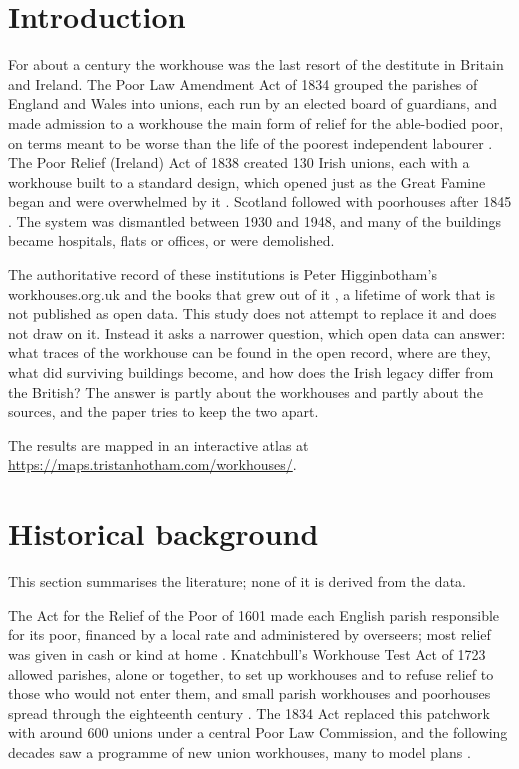 \documentclass[11pt,a4paper]{article}
\begin{document}
\section{Introduction}
For about a century the workhouse was the last resort of the destitute in Britain and Ireland. The Poor Law Amendment Act of 1834 grouped the parishes of England and Wales into unions, each run by an elected board of guardians, and made admission to a workhouse the main form of relief for the able-bodied poor, on terms meant to be worse than the life of the poorest independent labourer \citep{crowther,morrison}. The Poor Relief (Ireland) Act of 1838 created 130 Irish unions, each with a workhouse built to a standard design, which opened just as the Great Famine began and were overwhelmed by it \citep{oconnor,kinealy}. Scotland followed with poorhouses after 1845 \citep{higginbotham}. The system was dismantled between 1930 and 1948, and many of the buildings became hospitals, flats or offices, or were demolished.

The authoritative record of these institutions is Peter Higginbotham's workhouses.org.uk and the books that grew out of it \citep{higginbotham}, a lifetime of work that is not published as open data. This study does not attempt to replace it and does not draw on it. Instead it asks a narrower question, which open data can answer: what traces of the workhouse can be found in the open record, where are they, what did surviving buildings become, and how does the Irish legacy differ from the British? The answer is partly about the workhouses and partly about the sources, and the paper tries to keep the two apart.

The results are mapped in an interactive atlas at \url{https://maps.tristanhotham.com/workhouses/}.

\section{Historical background}
This section summarises the literature; none of it is derived from the data.

The Act for the Relief of the Poor of 1601 made each English parish responsible for its poor, financed by a local rate and administered by overseers; most relief was given in cash or kind at home \citep{slack}. Knatchbull's Workhouse Test Act of 1723 allowed parishes, alone or together, to set up workhouses and to refuse relief to those who would not enter them, and small parish workhouses and poorhouses spread through the eighteenth century \citep{slack,higginbotham}. The 1834 Act replaced this patchwork with around 600 unions under a central Poor Law Commission, and the following decades saw a programme of new union workhouses, many to model plans \citep{crowther,morrison}.
\end{document}
